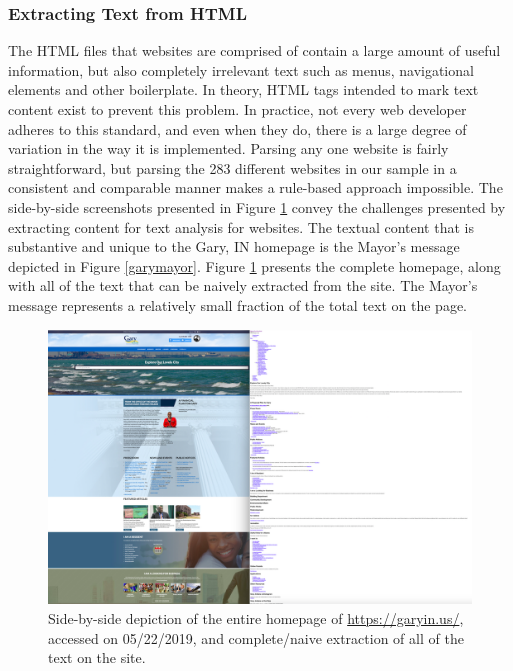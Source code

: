 \documentclass[11pt]{article}
\begin{document}
\subsubsection{Extracting Text from HTML}
The HTML files that websites are comprised of contain a large amount of useful information, but also completely irrelevant text such as menus, navigational elements and other boilerplate. In theory, HTML tags intended to mark text content  exist to prevent this problem. In practice, not every web developer adheres to this standard, and even when they do, there is a large degree of variation in the way it is implemented. Parsing any one website is fairly straightforward, but parsing the 283 different websites in our sample in a consistent and comparable manner makes a rule-based approach impossible. The side-by-side screenshots presented in Figure \ref{fig:garysbs} convey the challenges presented by extracting content for text analysis for websites. The textual content that is substantive and unique to the Gary, IN homepage is the Mayor's message depicted in Figure \ref{garymayor}. Figure \ref{fig:garysbs} presents the complete homepage, along with all of the text that can be naively extracted from the site. The Mayor's message represents a relatively small fraction of the total text on the page.


\begin{figure}
\centering
\includegraphics[scale=0.35]{figures/gary_sidebyside}
\caption{Side-by-side depiction of the entire homepage of \url{https://garyin.us/}, accessed on 05/22/2019, and complete/naive extraction of all of the text on the site.}
\label{fig:garysbs}
\end{figure}
\end{document}

